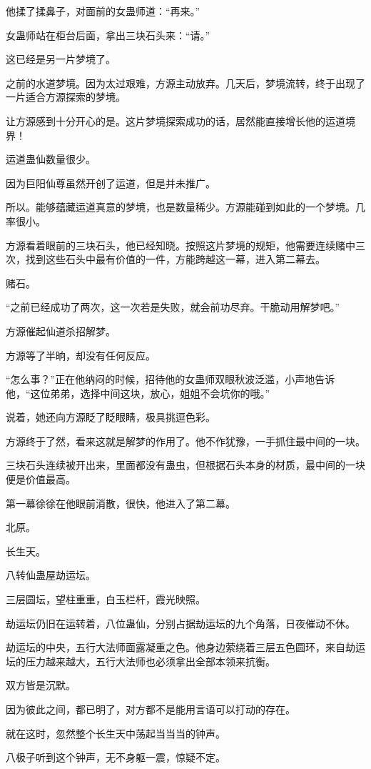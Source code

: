 \begin{this_body}
他揉了揉鼻子，对面前的女蛊师道：“再来。”

女蛊师站在柜台后面，拿出三块石头来：“请。”

这已经是另一片梦境了。

之前的水道梦境。因为太过艰难，方源主动放弃。几天后，梦境流转，终于出现了一片适合方源探索的梦境。

让方源感到十分开心的是。这片梦境探索成功的话，居然能直接增长他的运道境界！

运道蛊仙数量很少。

因为巨阳仙尊虽然开创了运道，但是并未推广。

所以。能够蕴藏运道真意的梦境，也是数量稀少。方源能碰到如此的一个梦境。几率很小。

方源看着眼前的三块石头，他已经知晓。按照这片梦境的规矩，他需要连续赌中三次，找到这些石头中最有价值的一件，方能跨越这一幕，进入第二幕去。

赌石。

“之前已经成功了两次，这一次若是失败，就会前功尽弃。干脆动用解梦吧。”

方源催起仙道杀招解梦。

方源等了半晌，却没有任何反应。

“怎么事？”正在他纳闷的时候，招待他的女蛊师双眼秋波泛滥，小声地告诉他，“这位弟弟，选择中间这块，放心，姐姐不会坑你的哦。”

说着，她还向方源眨了眨眼睛，极具挑逗色彩。

方源终于了然，看来这就是解梦的作用了。他不作犹豫，一手抓住最中间的一块。

三块石头连续被开出来，里面都没有蛊虫，但根据石头本身的材质，最中间的一块便是价值最高。

第一幕徐徐在他眼前消散，很快，他进入了第二幕。

北原。

长生天。

八转仙蛊屋劫运坛。

三层圆坛，望柱重重，白玉栏杆，霞光映照。

劫运坛仍旧在运转着，八位蛊仙，分别占据劫运坛的九个角落，日夜催动不休。

劫运坛的中央，五行大法师面露凝重之色。他身边萦绕着三层五色圆环，来自劫运坛的压力越来越大，五行大法师也必须拿出全部本领来抗衡。

双方皆是沉默。

因为彼此之间，都已明了，对方都不是能用言语可以打动的存在。

就在这时，忽然整个长生天中荡起当当当的钟声。

八极子听到这个钟声，无不身躯一震，惊疑不定。


\end{this_body}
